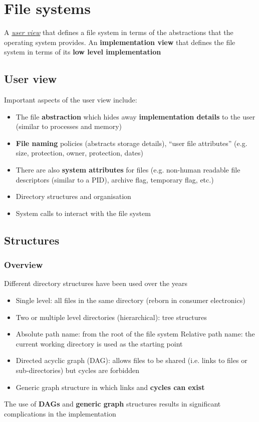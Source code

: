 \documentclass{article}
\newcommand{\worddef}[1]{\hyperref[sec:reference]{\textit{#1}}}
\begin{document}
\section{File systems}
\begin{flushleft}
A \worddef{user view} that defines a file system in terms of the abstractions that the operating system provides.
An \textbf{implementation view} that defines the file system in terms of its \textbf{low level implementation}
\end{flushleft}

\subsection{User view}
\begin{flushleft}
Important aspects of the user view include:
\begin{itemize}
	\item The file \textbf{abstraction} which hides away \textbf{implementation details} to the user (similar to processes and memory) 
	\item \textbf{File naming} policies (abstracts storage details), “user file attributes” (e.g. size, protection, owner, protection, dates)
	\item There are also \textbf{system attributes} for files (e.g. non-human readable file descriptors (similar to a PID), archive flag, temporary flag, etc.)
	\item Directory structures and organisation
	\item System calls to interact with the file system
\end{itemize}
\end{flushleft}

\subsection{Structures}
\subsubsection{Overview}
\begin{flushleft}
Different directory structures have been used over the years
\begin{itemize}
	\item Single level: all files in the same directory (reborn in consumer electronics)
	\item Two or multiple level directories (hierarchical): tree structures
	\item Absolute path name: from the root of the file system Relative path name: the current working directory is used as the starting point
	\item Directed acyclic graph (DAG): allows files to be shared (i.e. links to files or sub-directories) but cycles are forbidden
	\item Generic graph structure in which links and \textbf{cycles can exist}
\end{itemize}
The use of \textbf{DAGs} and \textbf{generic graph} structures results in significant complications in the implementation
\end{flushleft}
\end{document}
